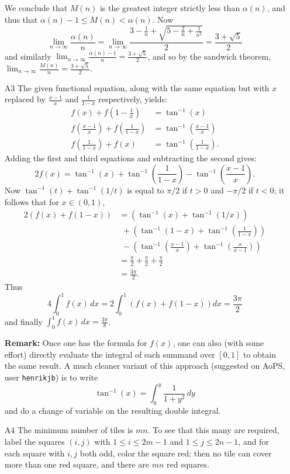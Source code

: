 \documentclass[amssymb,twocolumn,pra,10pt,aps]{revtex4-1}
\begin{document}
\begin{itemize}
We conclude that $M(n)$ is the greatest integer strictly less than $\alpha(n)$, and thus that 
$\alpha(n)-1 \leq M(n) < \alpha(n)$. Now
\[
\lim_{n\to\infty} \frac{\alpha(n)}{n} = \lim_{n\to\infty} \frac{3-\frac{1}{n}+\sqrt{5-\frac{2}{n}+\frac{1}{n^2}}}{2}
= \frac{3+\sqrt{5}}{2}
\]
and similarly $\lim_{n\to\infty} \frac{\alpha(n)-1}{n} = \frac{3+\sqrt{5}}{2}$, and so by the sandwich theorem, $\lim_{n\to\infty} \frac{M(n)}{n} = \frac{3+\sqrt{5}}{2}$.

\item[A3]
The given functional equation, along with the same equation but with $x$ replaced by $\frac{x-1}{x}$ and $\frac{1}{1-x}$ respectively, yields:
\begin{align*}
f(x) + f\left(1-\frac{1}{x}\right) &= \tan^{-1}(x) \\
f\left(\frac{x-1}{x}\right) + f\left(\frac{1}{1-x}\right) &= \tan^{-1}\left(\frac{x-1}{x}\right) \\
f\left(\frac{1}{1-x}\right) + f(x) &= \tan^{-1}\left(\frac{1}{1-x}\right).
\end{align*}
Adding the first and third equations and subtracting the second gives:
\[
2f(x) = \tan^{-1}(x) + \tan^{-1}\left(\frac{1}{1-x}\right) - \tan^{-1}\left(\frac{x-1}{x}\right).
\]
Now $\tan^{-1}(t) + \tan^{-1}(1/t)$ is equal to $\pi/2$ if $t>0$ and $-\pi/2$ if $t<0$; it follows that for $x \in (0,1)$,
\begin{align*}
2(f(x)+f(1-x)) &= \left(\tan^{-1}(x)+\tan^{-1}(1/x)\right)\\
&\,\, + \left(\tan^{-1}(1-x)+\tan^{-1}\left(\frac{1}{1-x}\right)\right) \\
&\,\,- 
\left(\tan^{-1}\left(\frac{x-1}{x}\right) + \tan^{-1}\left(\frac{x}{x-1}\right) \right) \\
&= \frac{\pi}{2} + \frac{\pi}{2} + \frac{\pi}{2} \\
&= \frac{3\pi}{2}.
\end{align*}
Thus
\[
4\int_0^1 f(x)\,dx = 2\int_0^1 (f(x)+f(1-x))dx = \frac{3\pi}{2}
\]
and finally $\int_0^1 f(x)\,dx = \frac{3\pi}{8}$.

\noindent
\textbf{Remark:}
Once one has the formula for $f(x)$, one can also (with some effort) directly evaluate the integral of each summand over $[0,1]$ to obtain the same result. A much cleaner variant of this approach (suggested on AoPS, user \texttt{henrikjb}) is to write
\[
\tan^{-1}(x) = \int_0^y \frac{1}{1+y^2}\,dy
\]
and do a change of variable on the resulting double integral.

\item[A4]
The minimum number of tiles is $mn$. To see that this many are required, label the squares $(i,j)$ with $1\leq i\leq 2m-1$ and $1\leq j\leq 2n-1$, and for each square with $i,j$ both odd, color the square red; then no tile can cover more than one red square, and there are $mn$ red squares.


\end{itemize}
\end{document}
